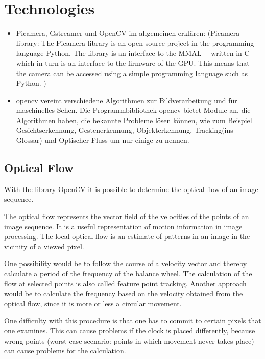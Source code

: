 \documentclass[12pt, a4paper]{report}
\begin{document}
    \chapter{Technologies}
    \begin{itemize}
        \item Picamera, Gstreamer und OpenCV im allgemeinen erklären:
        (Picamera library: The Picamera library is an open source project in the programming language Python. The library is an interface to the MMAL ---written in C--- which in turn is an interface to the firmware of the GPU.
    This means that the camera can be accessed using a simple programming language such as Python.  \cite{ReadTheDocsPicamera})    
        \item opencv vereint verschiedene Algorithmen zur Bildverarbeitung und für maschinelles Sehen. Die Programmbibliothek opencv bietet Module an, die Algorithmen haben, die bekannte Probleme lösen können, wie zum Beispiel Gesichtserkennung, Gestenerkennung, Objekterkennung, Tracking(ins Glossar) und Optischer Fluss um nur einige zu nennen.
  \end{itemize}
    
    \section{Optical Flow}
    With the library OpenCV it is possible to determine the optical flow of an image sequence. 
    
    The optical flow represents the vector field of the velocities of the points of an image sequence. It is a useful representation of motion information in image processing. The local optical flow is an estimate of patterns in an image in the vicinity of a viewed pixel. 
    
    One possibility would be to follow the course of a velocity vector and thereby calculate a period of the frequency of the balance wheel. The calculation of the flow at selected points is also called feature point tracking. Another approach would be to calculate the frequency based on the velocity obtained from the optical flow, since it is more or less a circular movement. 
    
    One difficulty with this procedure is that one has to commit to certain pixels that one examines. This can cause problems if the clock is placed differently, because wrong points (worst-case scenario: points in which movement never takes place) can cause problems for the calculation.  
    
\end{document}
